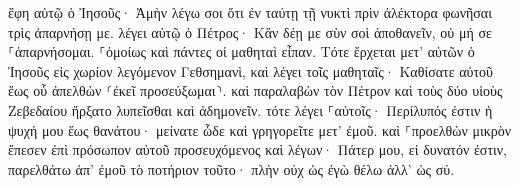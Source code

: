 \documentclass{openreader}
\begin{document}
ἔφη αὐτῷ ὁ Ἰησοῦς· Ἀμὴν λέγω σοι ὅτι ἐν ταύτῃ τῇ νυκτὶ πρὶν ἀλέκτορα φωνῆσαι τρὶς ἀπαρνήσῃ με. 
λέγει αὐτῷ ὁ Πέτρος· Κἂν δέῃ με σὺν σοὶ ἀποθανεῖν, οὐ μή σε ⸀ἀπαρνήσομαι. ⸀ὁμοίως καὶ πάντες οἱ μαθηταὶ εἶπαν. 
Τότε ἔρχεται μετ’ αὐτῶν ὁ Ἰησοῦς εἰς χωρίον λεγόμενον Γεθσημανὶ, καὶ λέγει τοῖς μαθηταῖς· Καθίσατε αὐτοῦ ἕως οὗ ἀπελθὼν ⸂ἐκεῖ προσεύξωμαι⸃. 
καὶ παραλαβὼν τὸν Πέτρον καὶ τοὺς δύο υἱοὺς Ζεβεδαίου ἤρξατο λυπεῖσθαι καὶ ἀδημονεῖν. 
τότε λέγει ⸀αὐτοῖς· Περίλυπός ἐστιν ἡ ψυχή μου ἕως θανάτου· μείνατε ὧδε καὶ γρηγορεῖτε μετ’ ἐμοῦ. 
καὶ ⸀προελθὼν μικρὸν ἔπεσεν ἐπὶ πρόσωπον αὐτοῦ προσευχόμενος καὶ λέγων· Πάτερ μου, εἰ δυνατόν ἐστιν, παρελθάτω ἀπ’ ἐμοῦ τὸ ποτήριον τοῦτο· πλὴν οὐχ ὡς ἐγὼ θέλω ἀλλ’ ὡς σύ. 
\end{document}
